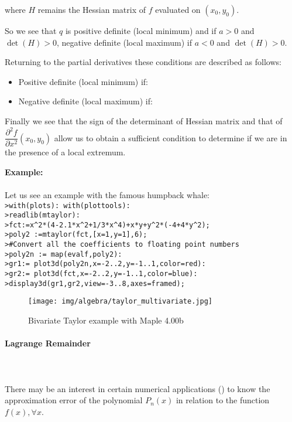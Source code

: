 	where $H$ remains the Hessian matrix of $f$ evaluated on $(x_0,y_0)$.
	
	So we see that $q$ is positive definite (local minimum) and if $a>0$ and $\det(H)>0$, negative definite (local maximum) if $a<0$ and $\det(H)>0$.
	
	Returning to the partial derivatives these conditions are described as follows:
	\begin{itemize}
		\item Positive definite (local minimum) if:
		
		
		\item Negative definite (local maximum) if:
		
	\end{itemize}
	Finally we see that the sign of the determinant of Hessian matrix and that of $\dfrac{\partial^2 f}{\partial x^2}(x_0,y_0)$ allow us to obtain a sufficient condition to determine if we are in the presence of a local extremum.
	
	\begin{tcolorbox}[colframe=black,colback=white,sharp corners]
	\textbf{{\Large {}}Example:}\\\\
	Let us see an example with the famous humpback whale:\\
	
	\texttt{>with(plots): with(plottools):\\
	>readlib(mtaylor):\\
	>fct:=x\string^2*(4-2.1*x\string^2+1/3*x\string^4)+x*y+y\string^2*(-4+4*y\string^2);\\
	>poly2 :=mtaylor(fct,[x=1,y=1],6);\\
	>\#Convert all the coefficients to floating point numbers\\
	>poly2n := map(evalf,poly2):\\
	>gr1:= plot3d(poly2n,x=-2..2,y=-1..1,color=red):\\
	>gr2:= plot3d(fct,x=-2..2,y=-1..1,color=blue):\\
	>display3d({gr1,gr2},view=-3..8,axes=framed);
	}
	\begin{figure}[H]
		\centering
		\texttt{[image: img/algebra/taylor\_multivariate.jpg]}
		\caption{Bivariate Taylor example with Maple 4.00b}
	\end{figure}
	\end{tcolorbox}
	
	\paragraph{Lagrange Remainder}\mbox{}\\\\
	There may be an interest in certain numerical applications () to know the approximation error of the polynomial $P_n(x)$ in relation to the function $f(x), \forall x$.
	
